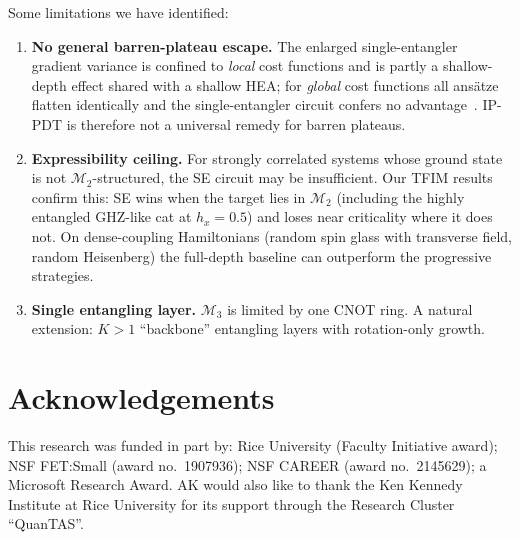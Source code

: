 \documentclass[11pt]{article}
\newcommand{\cM}{\mathcal{M}}
\theoremstyle{plain}
\theoremstyle{plain}
\begin{document}
Some limitations we have identified:
\begin{enumerate}[leftmargin=1.5em, nosep]
  \item \textbf{No general barren-plateau escape.}  The enlarged
    single-entangler gradient variance is confined to \emph{local} cost
    functions and is partly a shallow-depth effect shared with a shallow
    HEA; for \emph{global} cost functions all ans\"atze flatten
    identically and the single-entangler circuit confers no
    advantage~\cite{cerezo2021cost}.  IP-PDT is therefore not a universal
    remedy for barren plateaus.
  \item \textbf{Expressibility ceiling.}  For strongly correlated systems
    whose ground state is not $\cM_2$-structured, the SE circuit may be
    insufficient.  Our TFIM results confirm this: SE wins when the target
    lies in $\cM_2$ (including the highly entangled GHZ-like cat at
    $h_x = 0.5$) and loses near criticality where it does not.  On
    dense-coupling Hamiltonians (random spin glass with transverse field,
    random Heisenberg) the full-depth baseline can outperform the
    progressive strategies.
  \item \textbf{Single entangling layer.}  $\cM_3$ is limited by one
    CNOT ring.  A natural extension: $K>1$ ``backbone'' entangling
    layers with rotation-only growth.
\end{enumerate}

\section*{Acknowledgements}
This research was funded in part by: Rice University (Faculty Initiative
award); NSF FET:Small (award no.\ 1907936); NSF CAREER (award no.\ 2145629); a
Microsoft Research Award. AK would also like to thank the Ken Kennedy Institute
at Rice University for its support through the Research Cluster ``QuanTAS''.


\nocite{quetschlich2023mqtbench,sakurai2020modern,arora2018optimization,zhou2020qaoa}

\clearpage
\appendix
\end{document}
